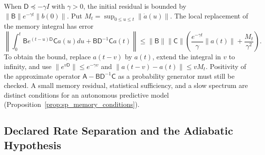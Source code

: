 When $\mathsf D\preceq-\gamma I$ with $\gamma>0$, the initial residual is bounded by $\|\mathsf B\|e^{-\gamma t}\|b(0)\|$. Put $M_t=\sup_{0\leq u\leq t}\|\dot a(u)\|$. The local replacement of the memory integral has error
\begin{equation}
\left\|\int_0^t\mathsf Be^{(t-u)\mathsf D}\mathsf Ca(u)du
+\mathsf B\mathsf D^{-1}\mathsf Ca(t)\right\|
\leq\|\mathsf B\|\|\mathsf C\|
\left(\frac{e^{-\gamma t}}{\gamma}\|a(t)\|+\frac{M_t}{\gamma^2}\right).
\label{eq:one_law_memory_error}
\end{equation}
To obtain the bound, replace $a(t-v)$ by $a(t)$, extend the integral in $v$ to infinity, and use $\|e^{v\mathsf D}\|\leq e^{-\gamma v}$ and $\|a(t-v)-a(t)\|\leq vM_t$. Positivity of the approximate operator $\mathsf A-\mathsf B\mathsf D^{-1}\mathsf C$ as a probability generator must still be checked. A small memory residual, statistical sufficiency, and a slow spectrum are distinct conditions for an autonomous predictive model (Proposition~\ref{prop:sp_memory_conditions}).

\subsection{Declared Rate Separation and the Adiabatic Hypothesis}
\label{sec:adiabatic_hierarchy}

